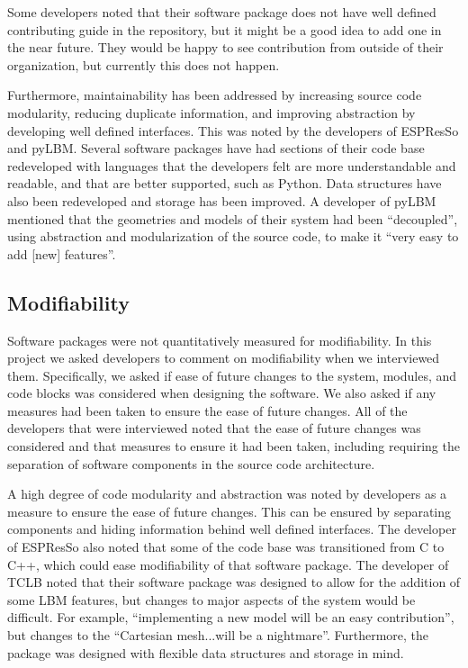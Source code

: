 \documentclass[12pt, notitlepage]{article}
\begin{document}
Some developers noted that their software package does not have well defined contributing guide in the repository, but it might be a good idea to add one in the near future. They would be happy to see contribution from outside of their organization, but currently this does not happen.

Furthermore, maintainability has been addressed by increasing source code modularity, reducing duplicate information, and improving abstraction by developing well defined interfaces. This was noted by the developers of ESPResSo and pyLBM. Several software packages have had sections of their code base redeveloped with languages that the developers felt are more understandable and readable, and that are better supported, such as Python. Data structures have also been redeveloped and storage has been improved. A developer of pyLBM mentioned that the geometries and models of their system had been ``decoupled'', using abstraction and modularization of the source code, to make it ``very easy to add [new] features''.

\subsection{Modifiability}

Software packages were not quantitatively measured for modifiability.
In this project we asked developers to comment on modifiability when we interviewed them. Specifically, we asked if ease of future changes to the system, modules, and code blocks was considered when designing the software. We also asked if any measures had been taken to ensure the ease of future changes. 
All of the developers that were interviewed noted that the ease of future changes was considered and that measures to ensure it had been taken, including
requiring the separation of software components in the source code architecture.

A high degree of code modularity and abstraction was noted by developers as a measure to ensure the ease of future changes. This can be ensured by separating components and hiding information behind well defined interfaces. The developer of ESPResSo also noted that some of the code base was transitioned from C to C++, which could ease modifiability of that software package. The developer of TCLB noted that their software package was designed to allow for the addition of some LBM features, but changes to major aspects of the system would be difficult. For example, ``implementing a new model will be an easy contribution'', but changes to the ``Cartesian mesh...will be a nightmare''. Furthermore, the package was designed with flexible data structures and storage in mind. 
\end{document}
